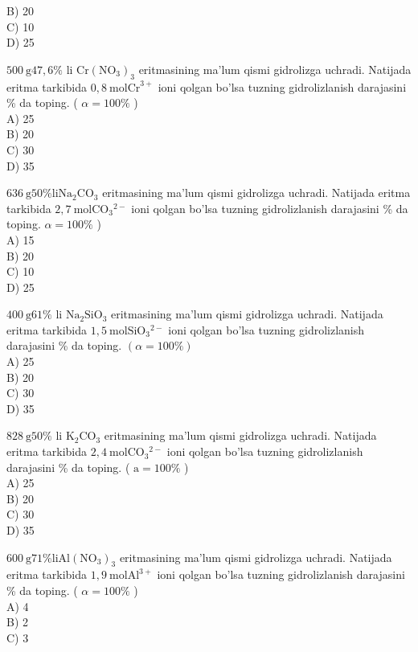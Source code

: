 B) 20\\
C) 10\\
D) 25
  \item $500 \mathrm{~g} 47,6 \%$ li $\mathrm{Cr}\left(\mathrm{NO}_{3}\right)_{3}$ eritmasining ma'lum qismi gidrolizga uchradi. Natijada eritma tarkibida $0,8 \mathrm{~mol} \mathrm{Cr}^{3+}$ ioni qolgan bo'lsa tuzning gidrolizlanish darajasini \% da toping. ( $\alpha=100 \%$ )\\
A) 25\\
B) 20\\
C) 30\\
D) 35
  \item $636 \mathrm{~g} 50 \% \mathrm{li} \mathrm{Na}_{2} \mathrm{CO}_{3}$ eritmasining ma'lum qismi gidrolizga uchradi. Natijada eritma tarkibida $2,7 \mathrm{~mol} \mathrm{CO}_{3}{ }^{2-}$ ioni qolgan bo'lsa tuzning gidrolizlanish darajasini \% da toping. $\alpha=100 \%$ )\\
A) 15\\
B) 20\\
C) 10\\
D) 25
  \item $400 \mathrm{~g} 61 \%$ li $\mathrm{Na}_{2} \mathrm{SiO}_{3}$ eritmasining ma'lum qismi gidrolizga uchradi. Natijada eritma tarkibida $1,5 \mathrm{~mol} \mathrm{SiO}_{3}{ }^{2-}$ ioni qolgan bo'lsa tuzning gidrolizlanish darajasini \% da toping. $(\alpha=100 \%)$\\
A) 25\\
B) 20\\
C) 30\\
D) 35
  \item $828 \mathrm{~g} 50 \%$ li $\mathrm{K}_{2} \mathrm{CO}_{3}$ eritmasining ma'lum qismi gidrolizga uchradi. Natijada eritma tarkibida $2,4 \mathrm{~mol} \mathrm{CO}_{3}{ }^{2-}$ ioni qolgan bo'lsa tuzning gidrolizlanish darajasini \% da toping. ( $\mathrm{a}=100 \%$ )\\
A) 25\\
B) 20\\
C) 30\\
D) 35
  \item $600 \mathrm{~g} 71 \% \mathrm{li} \mathrm{Al}\left(\mathrm{NO}_{3}\right)_{3}$ eritmasining ma’lum qismi gidrolizga uchradi. Natijada eritma tarkibida $1,9 \mathrm{~mol} \mathrm{Al}^{3+}$ ioni qolgan bo'lsa tuzning gidrolizlanish darajasini \% da toping. ( $\alpha=100 \%$ )\\
A) 4\\
B) 2\\
C) 3\\
